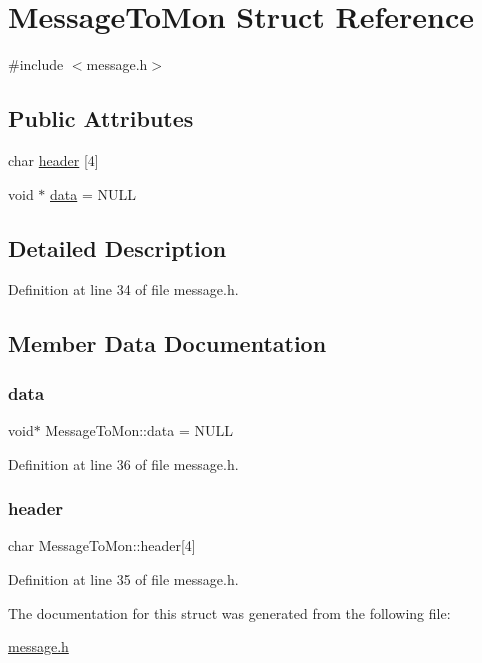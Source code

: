 \hypertarget{struct_message_to_mon}{}\section{Message\+To\+Mon Struct Reference}
\label{struct_message_to_mon}


{\ttfamily \#include $<$message.\+h$>$}

\subsection*{Public Attributes}
\begin{DoxyCompactItemize}
\item 
char \hyperlink{struct_message_to_mon_acb1096bef5e5c300f3d795556fda852a}{header} \mbox{[}4\mbox{]}
\item 
void $\ast$ \hyperlink{struct_message_to_mon_a4e5977ba9fb3fa07d435155731944d15}{data} = N\+U\+LL
\end{DoxyCompactItemize}


\subsection{Detailed Description}


Definition at line 34 of file message.\+h.



\subsection{Member Data Documentation}
\mbox{\label{struct_message_to_mon_a4e5977ba9fb3fa07d435155731944d15}} 
\subsubsection{\texorpdfstring{data}{data}}
{\footnotesize\ttfamily void$\ast$ Message\+To\+Mon\+::data = N\+U\+LL}



Definition at line 36 of file message.\+h.

\mbox{\label{struct_message_to_mon_acb1096bef5e5c300f3d795556fda852a}} 
\subsubsection{\texorpdfstring{header}{header}}
{\footnotesize\ttfamily char Message\+To\+Mon\+::header\mbox{[}4\mbox{]}}



Definition at line 35 of file message.\+h.



The documentation for this struct was generated from the following file\+:\begin{DoxyCompactItemize}
\item 
\hyperlink{message_8h}{message.\+h}\end{DoxyCompactItemize}
